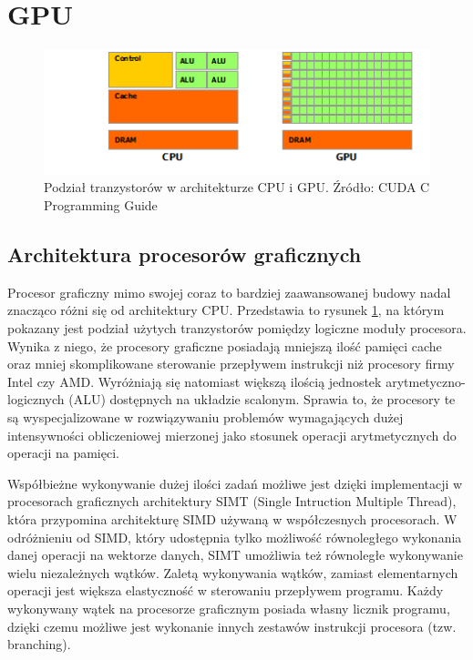 \section{GPU}


\begin{figure}[ht]
\centering
\includegraphics{images/gpu-devotes-more-transistors-to-data-processing.png}
\caption{Podział tranzystorów w architekturze CPU i GPU. Źródło: CUDA C Programming Guide}
\label{cpugpu}
\end{figure}

\subsection{Architektura procesorów graficznych}

Procesor graficzny mimo swojej coraz to bardziej zaawansowanej budowy nadal
znacząco różni się od architektury CPU. Przedstawia to rysunek \ref{cpugpu}, na
którym pokazany jest podział użytych tranzystorów pomiędzy logiczne moduły procesora.
Wynika z niego, że procesory graficzne posiadają mniejszą ilość pamięci cache oraz
mniej skomplikowane sterowanie przepływem instrukcji niż procesory firmy
Intel czy AMD. Wyróżniają się natomiast większą ilością jednostek arytmetyczno-logicznych
(ALU) dostępnych na układzie scalonym. Sprawia to, że procesory te są wyspecjalizowane w rozwiązywaniu
problemów wymagających dużej intensywności obliczeniowej mierzonej jako stosunek
operacji arytmetycznych do operacji na pamięci.

Współbieżne wykonywanie dużej ilości zadań możliwe jest dzięki implementacji
w procesorach graficznych architektury SIMT (Single Intruction Multiple Thread), która
przypomina architekturę SIMD używaną w współczesnych procesorach. W
odróżnieniu od SIMD, który udostępnia tylko możliwość równoległego wykonania danej
operacji na wektorze danych, SIMT umożliwia też równoległe wykonywanie wielu
niezależnych wątków. Zaletą wykonywania wątków, zamiast elementarnych operacji jest większa
elastyczność w sterowaniu przepływem programu. Każdy wykonywany wątek
na procesorze graficznym posiada własny licznik programu, dzięki czemu możliwe
jest wykonanie innych zestawów instrukcji procesora (tzw. branching).

